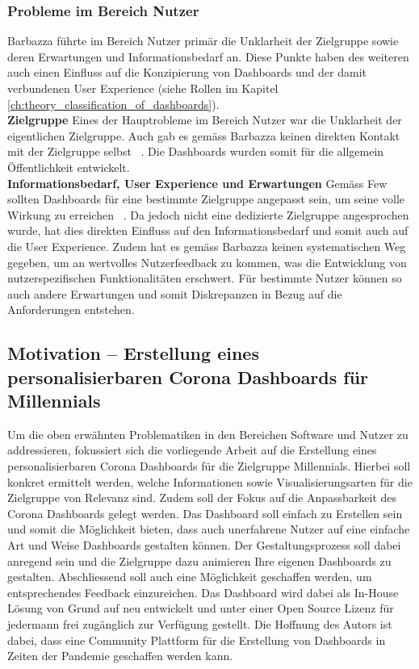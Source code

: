 \subsubsection{Probleme im Bereich Nutzer} \label{ch:user_problem_identification}
Barbazza führte im Bereich Nutzer primär die Unklarheit der Zielgruppe sowie deren Erwartungen und Informationsbedarf an. Diese Punkte haben des weiteren auch einen Einfluss auf die Konzipierung von Dashboards und der damit verbundenen User Experience (siehe Rollen im Kapitel \ref{ch:theory_classification_of_dashboards}).\\

\noindent
\textbf{Zielgruppe}
\newline
\indent
Eines der Hauptrobleme im Bereich Nutzer war die Unklarheit der eigentlichen Zielgruppe. Auch gab es gemäss Barbazza keinen direkten Kontakt mit der Zielgruppe selbst ~\citep[S. 8]{barbazza}. Die Dashboards wurden somit für die allgemein Öffentlichkeit entwickelt.\\

\noindent
\textbf{Informationsbedarf, User Experience und Erwartungen}
\newline
\indent
Gemäss Few sollten Dashboards für eine bestimmte Zielgruppe angepasst sein, um seine volle Wirkung zu erreichen ~\citep[S. 34]{information_dashboard_design}. Da jedoch nicht eine dedizierte Zielgruppe angesprochen wurde, hat dies direkten Einfluss auf den Informationsbedarf und somit auch auf die User Experience. Zudem hat es gemäss Barbazza keinen systematischen Weg gegeben, um an wertvolles Nutzerfeedback zu kommen, was die Entwicklung von nutzerspezifischen Funktionalitäten erschwert. Für bestimmte Nutzer können so auch andere Erwartungen und somit Diskrepanzen in Bezug auf die Anforderungen entstehen.

\clearpage
\subsection{Motivation – Erstellung eines personalisierbaren Corona Dashboards für Millennials}
Um die oben erwähnten Problematiken in den Bereichen Software und Nutzer zu addressieren, fokussiert sich die vorliegende Arbeit auf die Erstellung eines personalisierbaren Corona Dashboards für die Zielgruppe Millennials. Hierbei soll konkret ermittelt werden, welche Informationen sowie Visualisierungsarten für die Zielgruppe von Relevanz sind. Zudem soll der Fokus auf die Anpassbarkeit des Corona Dashboards gelegt werden. Das Dashboard soll einfach zu Erstellen sein und somit die Möglichkeit bieten, dass auch unerfahrene Nutzer auf eine einfache Art und Weise Dashboards gestalten können. Der Gestaltungsprozess soll dabei anregend sein und die Zielgruppe dazu animieren Ihre eigenen Dashboards zu gestalten. Abschliessend soll auch eine Möglichkeit geschaffen werden, um entsprechendes Feedback einzureichen. Das Dashboard wird dabei als In-House Lösung von Grund auf neu entwickelt und unter einer Open Source Lizenz für jedermann frei zugänglich zur Verfügung gestellt. Die Hoffnung des Autors ist dabei, dass eine Community Plattform für die Erstellung von Dashboards in Zeiten der Pandemie geschaffen werden kann.
